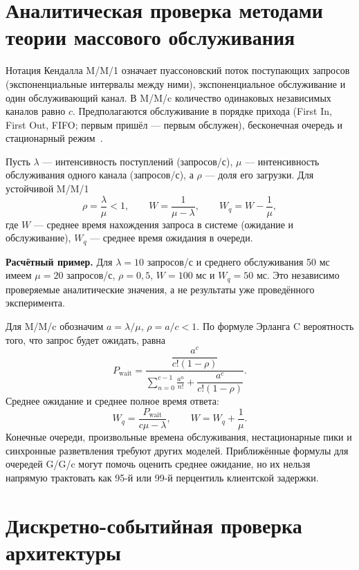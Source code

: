 \section{Аналитическая проверка методами теории массового обслуживания}

Нотация Кендалла M/M/1 означает пуассоновский поток поступающих запросов (экспоненциальные интервалы между ними), экспоненциальное обслуживание и один обслуживающий канал. В M/M/c количество одинаковых независимых каналов равно $c$. Предполагаются обслуживание в порядке прихода (First In, First Out, FIFO; первым пришёл --- первым обслужен), бесконечная очередь и стационарный режим~\cite{kleinrock1975queueing,harchol2013performance}.

Пусть $\lambda$ --- интенсивность поступлений (запросов/с), $\mu$ --- интенсивность обслуживания одного канала (запросов/с), а $\rho$ --- доля его загрузки. Для устойчивой M/M/1
\begin{equation}
\rho=\frac{\lambda}{\mu}<1,\qquad
W=\frac{1}{\mu-\lambda},\qquad
W_q=W-\frac{1}{\mu},
\end{equation}
где $W$ --- среднее время нахождения запроса в системе (ожидание и обслуживание), $W_q$ --- среднее время ожидания в очереди.

\textbf{Расчётный пример.} Для $\lambda=10$ запросов/с и среднего обслуживания 50 мс имеем $\mu=20$ запросов/с, $\rho=0{,}5$, $W=100$ мс и $W_q=50$ мс. Это независимо проверяемые аналитические значения, а не результаты уже проведённого эксперимента.

Для M/M/c обозначим $a=\lambda/\mu$, $\rho=a/c<1$. По формуле Эрланга C вероятность того, что запрос будет ожидать, равна
\begin{equation}
P_{\mathrm{wait}}=
\frac{\dfrac{a^c}{c!(1-\rho)}}
{\displaystyle\sum_{n=0}^{c-1}\frac{a^n}{n!}
+\dfrac{a^c}{c!(1-\rho)}}.
\end{equation}
Среднее ожидание и среднее полное время ответа:
\begin{equation}
W_q=\frac{P_{\mathrm{wait}}}{c\mu-\lambda},\qquad
W=W_q+\frac{1}{\mu}.
\end{equation}
Конечные очереди, произвольные времена обслуживания, нестационарные пики и синхронные разветвления требуют других моделей. Приближённые формулы для очередей G/G/c могут помочь оценить среднее ожидание, но их нельзя напрямую трактовать как 95-й или 99-й перцентиль клиентской задержки.

\section{Дискретно-событийная проверка архитектуры}

